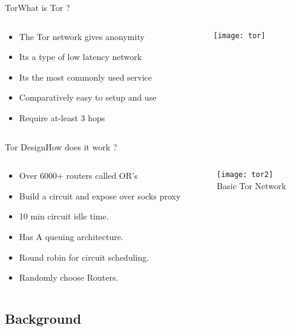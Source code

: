 \documentclass{beamer}
\begin{document}
\begin{frame}{Tor}{What is Tor ?}
\begin{columns}[T]
\begin{column}{0.5\textwidth}
  \begin{itemize}
  \item {The Tor network gives anonymity}
  \item {Its a type of low latency network}
  \item {Its the most commonly used service}
  \item {Comparatively easy to setup and use}
  \item {Require at-least 3 hops}
  \end{itemize}
  \end{column}
  \begin{column}{0.5\textwidth}
   \texttt{[image: tor]} 
  \end{column}
  \end{columns}
\end{frame}
\begin{frame}{Tor Design}{How does it work ?}
\begin{columns}[T]

\begin{column}{0.5\textwidth}
\begin{itemize}
    \item   Over 6000+ routers called OR's 
    \item  Build a circuit and expose over socks proxy
    \item 10 min circuit idle time.
    \item Has A queuing architecture.
    \item Round robin for circuit scheduling.
    \item Randomly choose Routers.
\end{itemize}

\end{column}

\begin{column}{0.5\textwidth}
\texttt{[image: tor2]}\\
Basic Tor Network\footnotemark
{}

\end{column}
\end{columns}  
\end{frame}
\subsection{Background}
\end{document}
